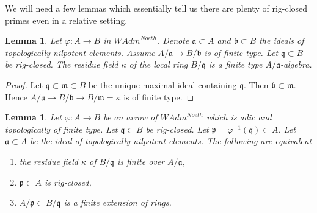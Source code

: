 \documentclass{stacks-project}
\theoremstyle{plain}
\newtheorem{lemma}[subsection]{Lemma}
\theoremstyle{definition}
\theoremstyle{remark}
\numberwithin{equation}{subsection}
\begin{document}
\noindent
We will need a few lemmas which essentially tell us there are
plenty of rig-closed primes even in a relative setting.

\begin{lemma}
\label{lemma-rig-closed-point-relative-residue-field}
Let $\varphi : A \to B$ in $\textit{WAdm}^{Noeth}$.
Denote $\mathfrak a \subset A$ and $\mathfrak b \subset B$
the ideals of topologically nilpotent elements. Assume
$A/\mathfrak a \to B/\mathfrak b$ is of finite type.
Let $\mathfrak q \subset B$ be rig-closed.
The residue field $\kappa$ of the local ring $B/\mathfrak q$
is a finite type $A/\mathfrak a$-algebra.
\end{lemma}

\begin{proof}
Let $\mathfrak q \subset \mathfrak m \subset B$ be the unique
maximal ideal containing $\mathfrak q$.
Then $\mathfrak b \subset \mathfrak m$. Hence
$A/\mathfrak a \to B/\mathfrak b \to B/\mathfrak m = \kappa$ is
of finite type.
\end{proof}

\begin{lemma}
\label{lemma-rig-closed-point-relative}
Let $\varphi : A \to B$ be an arrow of $\textit{WAdm}^{Noeth}$
which is adic and topologically of finite type.
Let $\mathfrak q \subset B$ be rig-closed.
Let $\mathfrak p = \varphi^{-1}(\mathfrak q) \subset A$.
Let $\mathfrak a \subset A$ be the ideal of topologically nilpotent
elements.
The following are equivalent
\begin{enumerate}
\item the residue field $\kappa$ of $B/\mathfrak q$ is finite
over $A/\mathfrak a$,
\item $\mathfrak p \subset A$ is rig-closed,
\item $A/\mathfrak p \subset B/\mathfrak q$ is a finite extension
of rings.
\end{enumerate}
\end{lemma}
\end{document}
